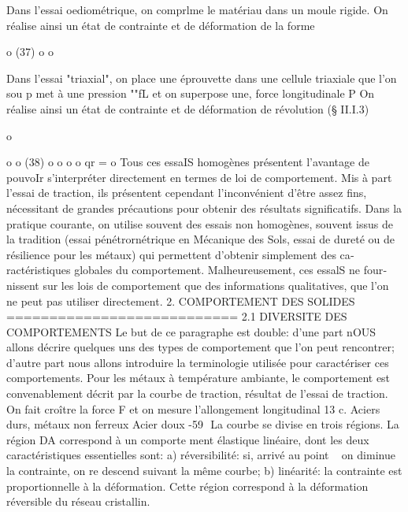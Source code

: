 Dans l'essai oediométrique, on comprlme le matériau dans un moule rigide. On réalise ainsi un état de contrainte et de déformation de la forme 

o 
(37) 
o o 



Dans l'essai "triaxial", on place une éprou­vette dans une cellule triaxiale que l'on sou­
p 
met à une pression ""fL et on superpose une, force longitudinale P On réalise ainsi un état de contrainte et de déformation de révolution (§ II.I.3) 

o 

o o 
(38) 
o o o o 
qr =
o 
Tous ces essaIS homogènes présentent l'avantage de pouvoIr s'inter­préter directement en termes de loi de comportement. Mis à part l'essai de traction, ils présentent cependant l'inconvénient d'être assez fins, nécessi­tant de grandes précautions pour obtenir des résultats significatifs. Dans la pratique courante, on utilise souvent des essais non homogènes, souvent issus de la tradition (essai pénétrornétrique en Mécanique des Sols, essai de dureté ou de résilience pour les métaux) qui permettent d'obtenir simplement des ca­ractéristiques globales du comportement. Malheureusement, ces essalS ne four­nissent sur les lois de comportement que des informations qualitatives, que l'on ne peut pas utiliser directement. 
2. COMPORTEMENT DES SOLIDES 
=========================== 
2.1 DIVERSITE DES COMPORTEMENTS 
Le but de ce paragraphe est double: d'une part nOUS allons décrire quelques uns des types de comportement que l'on peut rencontrer; d'autre part nous allons introduire la terminologie utilisée pour caractériser ces compor­tements. 
Pour les métaux à température ambiante, le comportement est convena­blement décrit par la courbe de traction, résultat de l'essai de traction. On fait croître la force F et on mesure l'allongement longitudinal 
13 
c. 
Aciers durs, métaux non ferreux
Acier doux 
-59 ­
La courbe se divise en trois régions. La région DA correspond à un comporte­
ment élastique linéaire, dont les deux caractéristiques essentielles sont: 
a) réversibilité: si, arrivé au point ~ on diminue la contrainte, on re­
descend suivant la même courbe; 
b) linéarité: la contrainte est proportionnelle à la déformation. 
Cette région correspond à la déformation réversible du réseau cristallin. 

